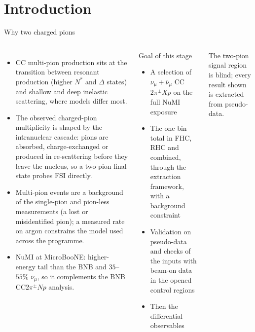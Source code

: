 \documentclass[aspectratio=169,10pt]{beamer}
\begin{document}
\section{Introduction}

\begin{frame}{Why two charged pions}
  \begin{columns}[T]
  \begin{itemize}\small\setlength\itemsep{3pt}
    \item CC multi-pion production sits at the transition between resonant production (higher $N^*$
          and $\Delta$ states) and shallow and deep inelastic scattering, where models differ most.
    \item The observed charged-pion multiplicity is shaped by the intranuclear cascade: pions are
          absorbed, charge-exchanged or produced in re-scattering before they leave the nucleus, so a
          two-pion final state probes FSI directly.
    \item Multi-pion events are a background of the single-pion and pion-less measurements (a lost or
          misidentified pion); a measured rate on argon constrains the model used across the programme.
    \item NuMI at MicroBooNE: higher-energy tail than the BNB and $35$--$55\%$ $\bar\nu_\mu$, so it
          complements the BNB CC$2\pi^\pm Np$ analysis.
  \end{itemize}
  \begin{block}{\small Goal of this stage}\small
    \begin{itemize}\setlength\itemsep{2pt}
      \item A selection of $\nu_\mu+\bar\nu_\mu$ CC$2\pi^\pm Xp$ on the full NuMI exposure
      \item The one-bin total in FHC, RHC and combined, through the extraction framework, with a
            background constraint
      \item Validation on pseudo-data and checks of the inputs with beam-on data in the opened control
            regions
      \item Then the differential observables
    \end{itemize}
  \end{block}
  \vspace{1mm}
  {\footnotesize The two-pion signal region is blind; every result shown is extracted from pseudo-data.}
  \end{columns}
\end{frame}
\end{document}
